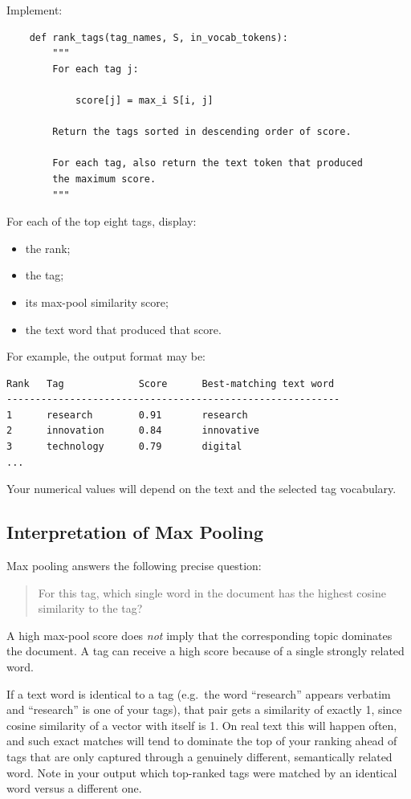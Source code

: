 \documentclass[12pt]{article}
\begin{document}
Implement:

\begin{lstlisting}
    def rank_tags(tag_names, S, in_vocab_tokens):
        """
        For each tag j:

            score[j] = max_i S[i, j]

        Return the tags sorted in descending order of score.

        For each tag, also return the text token that produced
        the maximum score.
        """
\end{lstlisting}

For each of the top eight tags, display:

\begin{itemize}
    \item the rank;
    \item the tag;
    \item its max-pool similarity score;
    \item the text word that produced that score.
\end{itemize}

For example, the output format may be:

\begin{verbatim}
Rank   Tag             Score      Best-matching text word
----------------------------------------------------------
1      research        0.91       research
2      innovation      0.84       innovative
3      technology      0.79       digital
...
\end{verbatim}

Your numerical values will depend on the text and the selected tag
vocabulary.

\subsection*{Interpretation of Max Pooling}

Max pooling answers the following precise question:

\begin{quote}
For this tag, which single word in the document has the highest
cosine similarity to the tag?
\end{quote}

A high max-pool score does \emph{not} imply that the corresponding
topic dominates the document. A tag can receive a high score because
of a single strongly related word.

If a text word is identical to a tag (e.g.\ the word ``research''
appears verbatim and ``research'' is one of your tags), that pair
gets a similarity of exactly 1, since cosine similarity of a vector
with itself is 1. On real text this will happen often, and such exact
matches will tend to dominate the top of your ranking ahead of tags
that are only captured through a genuinely different, semantically
related word. Note in your output which top-ranked tags were matched
by an identical word versus a different one.
\end{document}
